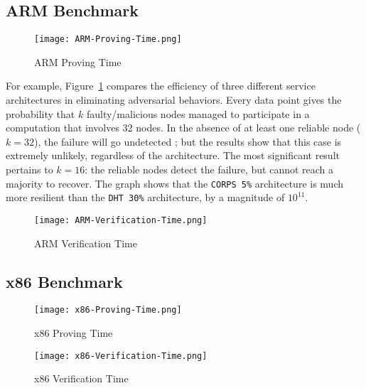 \documentclass{scrartcl}
\begin{document}
\subsection{ARM Benchmark}

\begin{figure}
	\begin{center}
		\texttt{[image: ARM-Proving-Time.png]}
	\end{center}
	\caption{ARM Proving Time}
	\label{graph:arm-proving-time}
\end{figure}

For example, Figure~\ref{graph:arm-proving-time} compares the efficiency of three different service architectures in eliminating adversarial behaviors. Every data point gives the probability that $k$ faulty/malicious nodes managed to participate in a computation that involves 32 nodes. In the absence of at least one reliable node ($k = 32$), the failure will go undetected ; but the results show that this case is extremely unlikely, regardless of the architecture. The most significant result pertains to $k = 16$: the reliable nodes detect the failure, but cannot reach a majority to recover. The graph shows that the \texttt{CORPS 5\%} architecture is much more resilient than the \texttt{DHT 30\%} architecture, by a magnitude of $10^{11}$.

\begin{figure}
	\begin{center}
		\texttt{[image: ARM-Verification-Time.png]}
	\end{center}
	\caption{ARM Verification Time}
	\label{graph:arm-verification-time}
\end{figure}

\subsection{x86 Benchmark}

\begin{figure}
	\begin{center}
		\texttt{[image: x86-Proving-Time.png]}
	\end{center}
	\caption{x86 Proving Time}
	\label{graph:x86-proving-time}
\end{figure}

\begin{figure}
	\begin{center}
		\texttt{[image: x86-Verification-Time.png]}
	\end{center}
	\caption{x86 Verification Time}
	\label{graph:x86-verification-time}
\end{figure}
\end{document}
